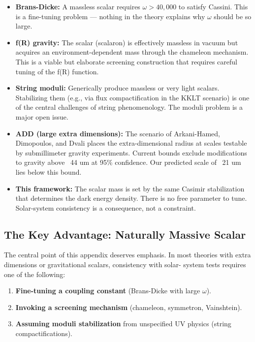 \documentclass[aps,prd,preprint,superscriptaddress,longbibliography,floatfix]{revtex4-2}
\theoremstyle{remark}
\begin{document}
\begin{itemize}
  \item \textbf{Brans-Dicke:} A massless scalar requires $\omega > 40,000$ to satisfy Cassini. This is a fine-tuning problem --- nothing in the theory explains why $\omega$ should be so large.
  \item \textbf{f(R) gravity:} The scalar (scalaron) is effectively massless in vacuum but acquires an environment-dependent mass through the chameleon mechanism. This is a viable but elaborate screening construction that requires careful tuning of the f(R) function.
  \item \textbf{String moduli:} Generically produce massless or very light scalars. Stabilizing them (e.g., via flux compactification in the KKLT scenario) is one of the central challenges of string phenomenology. The moduli problem is a major open issue.
  \item \textbf{ADD (large extra dimensions):} The scenario of Arkani-Hamed, Dimopoulos, and Dvali places the extra-dimensional radius at scales testable by submillimeter gravity experiments. Current bounds \cite{Kapneretal2007} exclude modifications to gravity above ~44 um at 95\% confidence. Our predicted scale of ~21 um lies below this bound.
  \item \textbf{This framework:} The scalar mass is set by the same Casimir stabilization that determines the dark energy density. There is no free parameter to tune. Solar-system consistency is a consequence, not a constraint.
\end{itemize}



\subsection{The Key Advantage: Naturally Massive Scalar}

The central point of this appendix deserves emphasis. In most theories with extra dimensions or gravitational scalars, consistency with solar- system tests requires one of the following:


\begin{enumerate}
  \item \textbf{Fine-tuning a coupling constant} (Brans-Dicke with large $\omega$).
  \item \textbf{Invoking a screening mechanism} (chameleon, symmetron, Vainshtein).
  \item \textbf{Assuming moduli stabilization} from unspecified UV physics (string compactifications).
\end{enumerate}
\end{document}
